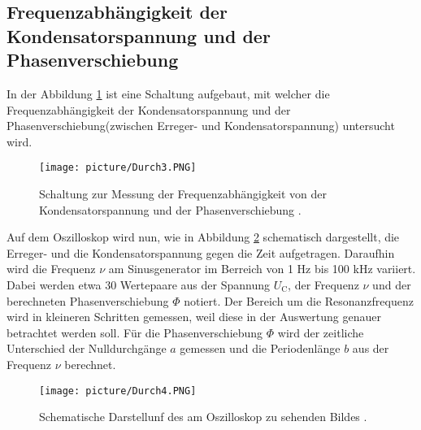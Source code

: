 \subsection{Frequenzabhängigkeit der Kondensatorspannung und der Phasenverschiebung}
In der Abbildung \ref{fig:Durch3} ist eine Schaltung aufgebaut, mit welcher die Frequenzabhängigkeit der Kondensatorspannung und der Phasenverschiebung(zwischen Erreger- und Kondensatorspannung) untersucht wird.

\begin{figure}
  \centering
  \texttt{[image: picture/Durch3.PNG]}
  \caption{Schaltung zur Messung der Frequenzabhängigkeit von der Kondensatorspannung und der Phasenverschiebung \cite[296]{sample}.}
  \label{fig:Durch3}
\end{figure}

Auf dem Oszilloskop wird nun, wie in Abbildung \ref{fig:Durch4} schematisch dargestellt, die Erreger- und die Kondensatorspannung gegen die Zeit aufgetragen. Daraufhin wird die Frequenz $\nu$ am Sinusgenerator im Berreich von 1 Hz bis 100 kHz variiert. Dabei werden etwa 30 Wertepaare aus der Spannung $U_\text{C}$, der Frequenz $\nu$ und der berechneten Phasenverschiebung $\Phi$ notiert. Der Bereich um die Resonanzfrequenz wird in kleineren Schritten gemessen, weil diese in der Auswertung genauer betrachtet werden soll. Für die Phasenverschiebung $\Phi$ wird der zeitliche Unterschied der Nulldurchgänge $a$ gemessen und die Periodenlänge $b$ aus der Frequenz $\nu$ berechnet.   

\begin{figure}
  \centering
  \texttt{[image: picture/Durch4.PNG]}
  \caption{Schematische Darstellunf des am Oszilloskop zu sehenden Bildes \cite[282]{samples}.}
  \label{fig:Durch4}
\end{figure}
